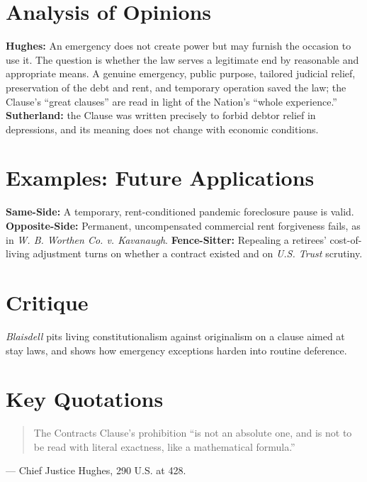 \documentclass[12pt]{article}
\begin{document}
\section{Analysis of Opinions}
\textbf{Hughes:} An emergency does not create power but may furnish the occasion to use it. The question is whether the law serves a legitimate end by reasonable and appropriate means. A genuine emergency, public purpose, tailored judicial relief, preservation of the debt and rent, and temporary operation saved the law; the Clause's ``great clauses'' are read in light of the Nation's ``whole experience.'' \textbf{Sutherland:} the Clause was written precisely to forbid debtor relief in depressions, and its meaning does not change with economic conditions.

\section{Examples: Future Applications}
\textbf{Same-Side:} A temporary, rent-conditioned pandemic foreclosure pause is valid. \textbf{Opposite-Side:} Permanent, uncompensated commercial rent forgiveness fails, as in \textit{W. B. Worthen Co. v. Kavanaugh}. \textbf{Fence-Sitter:} Repealing a retirees' cost-of-living adjustment turns on whether a contract existed and on \textit{U.S. Trust} scrutiny.

\section{Critique}
\textit{Blaisdell} pits living constitutionalism against originalism on a clause aimed at stay laws, and shows how emergency exceptions harden into routine deference.

\section{Key Quotations}
\begin{quote}
The Contracts Clause's prohibition ``is not an absolute one, and is not to be read with literal exactness, like a mathematical formula.''
\end{quote}
\noindent --- Chief Justice Hughes, 290 U.S. at 428.
\end{document}

